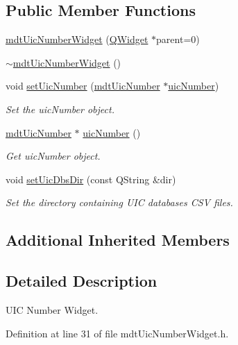 \subsection*{Public Member Functions}
\begin{DoxyCompactItemize}
\item 
\hyperlink{classmdt_uic_number_widget_a1742d3d2c2f697098a8ecc7b2c87d644}{mdt\-Uic\-Number\-Widget} (\hyperlink{class_q_widget}{Q\-Widget} $\ast$parent=0)
\item 
\hyperlink{classmdt_uic_number_widget_a2b722df11631e5311b51d09ce6e5dbe8}{$\sim$mdt\-Uic\-Number\-Widget} ()
\item 
void \hyperlink{classmdt_uic_number_widget_a8555bdd4ce7050ef9a516d33625200e0}{set\-Uic\-Number} (\hyperlink{classmdt_uic_number}{mdt\-Uic\-Number} $\ast$\hyperlink{classmdt_uic_number_widget_a3d2d6790e043f48d59a63eef7341fd99}{uic\-Number})
\begin{DoxyCompactList}\small\item\em Set the uic\-Number object. \end{DoxyCompactList}\item 
\hyperlink{classmdt_uic_number}{mdt\-Uic\-Number} $\ast$ \hyperlink{classmdt_uic_number_widget_a3d2d6790e043f48d59a63eef7341fd99}{uic\-Number} ()
\begin{DoxyCompactList}\small\item\em Get uic\-Number object. \end{DoxyCompactList}\item 
void \hyperlink{classmdt_uic_number_widget_a1ca77bc9c81ba3aa8ad4205186b05114}{set\-Uic\-Dbs\-Dir} (const Q\-String \&dir)
\begin{DoxyCompactList}\small\item\em Set the directory containing U\-I\-C databases C\-S\-V files. \end{DoxyCompactList}\end{DoxyCompactItemize}
\subsection*{Additional Inherited Members}


\subsection{Detailed Description}
U\-I\-C Number Widget. 

Definition at line 31 of file mdt\-Uic\-Number\-Widget.\-h.



